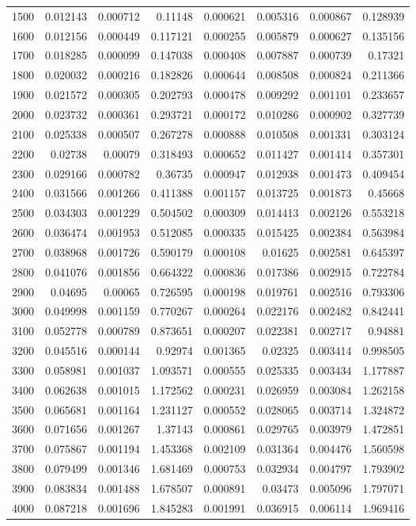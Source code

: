 \begin{tabular}{r r r r r r r r}
1500 & 0.012143 & 0.000712 & 0.11148 & 0.000621 & 0.005316 & 0.000867 & 0.128939 \\
1600 & 0.012156 & 0.000449 & 0.117121 & 0.000255 & 0.005879 & 0.000627 & 0.135156 \\
1700 & 0.018285 & 0.000099 & 0.147038 & 0.000408 & 0.007887 & 0.000739 & 0.17321 \\
1800 & 0.020032 & 0.000216 & 0.182826 & 0.000644 & 0.008508 & 0.000824 & 0.211366 \\
1900 & 0.021572 & 0.000305 & 0.202793 & 0.000478 & 0.009292 & 0.001101 & 0.233657 \\
2000 & 0.023732 & 0.000361 & 0.293721 & 0.000172 & 0.010286 & 0.000902 & 0.327739 \\
2100 & 0.025338 & 0.000507 & 0.267278 & 0.000888 & 0.010508 & 0.001331 & 0.303124 \\
2200 & 0.02738 & 0.00079 & 0.318493 & 0.000652 & 0.011427 & 0.001414 & 0.357301 \\
2300 & 0.029166 & 0.000782 & 0.36735 & 0.000947 & 0.012938 & 0.001473 & 0.409454 \\
2400 & 0.031566 & 0.001266 & 0.411388 & 0.001157 & 0.013725 & 0.001873 & 0.45668 \\
2500 & 0.034303 & 0.001229 & 0.504502 & 0.000309 & 0.014413 & 0.002126 & 0.553218 \\
2600 & 0.036474 & 0.001953 & 0.512085 & 0.000335 & 0.015425 & 0.002384 & 0.563984 \\
2700 & 0.038968 & 0.001726 & 0.590179 & 0.000108 & 0.01625 & 0.002581 & 0.645397 \\
2800 & 0.041076 & 0.001856 & 0.664322 & 0.000836 & 0.017386 & 0.002915 & 0.722784 \\
2900 & 0.04695 & 0.00065 & 0.726595 & 0.000198 & 0.019761 & 0.002516 & 0.793306 \\
3000 & 0.049998 & 0.001159 & 0.770267 & 0.000264 & 0.022176 & 0.002482 & 0.842441 \\
3100 & 0.052778 & 0.000789 & 0.873651 & 0.000207 & 0.022381 & 0.002717 & 0.94881 \\
3200 & 0.045516 & 0.000144 & 0.92974 & 0.001365 & 0.02325 & 0.003414 & 0.998505 \\
3300 & 0.058981 & 0.001037 & 1.093571 & 0.000555 & 0.025335 & 0.003434 & 1.177887 \\
3400 & 0.062638 & 0.001015 & 1.172562 & 0.000231 & 0.026959 & 0.003084 & 1.262158 \\
3500 & 0.065681 & 0.001164 & 1.231127 & 0.000552 & 0.028065 & 0.003714 & 1.324872 \\
3600 & 0.071656 & 0.001267 & 1.37143 & 0.000861 & 0.029765 & 0.003979 & 1.472851 \\
3700 & 0.075867 & 0.001194 & 1.453368 & 0.002109 & 0.031364 & 0.004476 & 1.560598 \\
3800 & 0.079499 & 0.001346 & 1.681469 & 0.000753 & 0.032934 & 0.004797 & 1.793902 \\
3900 & 0.083834 & 0.001488 & 1.678507 & 0.000891 & 0.03473 & 0.005096 & 1.797071 \\
4000 & 0.087218 & 0.001696 & 1.845283 & 0.001991 & 0.036915 & 0.006114 & 1.969416 \\
\end{tabular}

